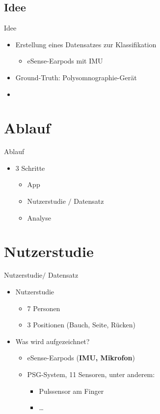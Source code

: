 \documentclass[18pt]{beamer}
\begin{document}
\subsection{Idee}
\begin{frame}{Idee}
\begin{itemize}
\item Erstellung eines Datensatzes zur Klassifikation
\begin{itemize}
    \item eSense-Earpods mit IMU
\end{itemize}
\item Ground-Truth: Polysomnographie-Gerät
\item {}
\end{itemize}
\end{frame}

\section{Ablauf}
\begin{frame}{Ablauf}
\begin{itemize}
    \item 3 Schritte
    \begin{itemize}
        \item App
        \item Nutzerstudie $/$ Datensatz
        \item Analyse
    \end{itemize}
\end{itemize}
\end{frame}

\section{Nutzerstudie}
\begin{frame}{Nutzerstudie$/$ Datensatz}
\begin{itemize}
    \item Nutzerstudie
    \begin{itemize}
        \item 7 Personen 
        \item 3 Positionen (Bauch, Seite, Rücken)
    \end{itemize}
    \item Was wird aufgezeichnet?
    \begin{itemize}
        \item eSense-Earpods (\textbf{IMU, Mikrofon})
        \item PSG-System, 11 Sensoren, unter anderem:
        \begin{itemize}
            \item Pulssensor am Finger
            \item \dots {}
        \end{itemize}
    \end{itemize}
\end{itemize}
\end{frame}
\end{document}
